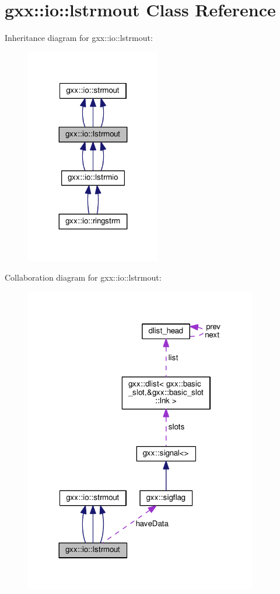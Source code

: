 \hypertarget{classgxx_1_1io_1_1lstrmout}{}\section{gxx\+:\+:io\+:\+:lstrmout Class Reference}
\label{classgxx_1_1io_1_1lstrmout}


Inheritance diagram for gxx\+:\+:io\+:\+:lstrmout\+:
\nopagebreak
\begin{figure}[H]
\begin{center}
\leavevmode
\includegraphics[width=167pt]{classgxx_1_1io_1_1lstrmout__inherit__graph}
\end{center}
\end{figure}


Collaboration diagram for gxx\+:\+:io\+:\+:lstrmout\+:
\nopagebreak
\begin{figure}[H]
\begin{center}
\leavevmode
\includegraphics[width=288pt]{classgxx_1_1io_1_1lstrmout__coll__graph}
\end{center}
\end{figure}
